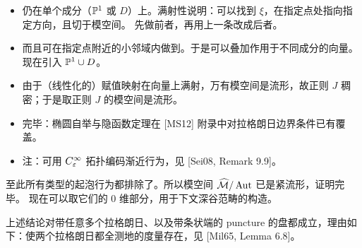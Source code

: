
\begin{itemize}[leftmargin=1.6em,itemsep=0.2em]
\item 仍在单个成分（$\mathbb{P}^1$ 或 $D$）上。满射性说明：可以找到 $\xi$，在指定点处指向指定方向，且切于模空间。
      先做前者，再用上一条改成后者。
\item 而且可在指定点附近的小邻域内做到。于是可以叠加作用于不同成分的向量。现在引入 $\mathbb{P}^1\cup D$。
\item 由于（线性化的）赋值映射在向量上满射，万有模空间是流形，故正则 $J$ 稠密；于是取正则 $J$ 的模空间是流形。
\item 完毕：椭圆自举与隐函数定理在 [MS12] 附录中对拉格朗日边界条件已有覆盖。
\item 注：可用 $C^\infty_\varepsilon$ 拓扑编码渐近行为，见 [Sei08, Remark 9.9]。
\end{itemize}

至此所有类型的起泡行为都排除了。所以模空间 $\widehat{\mathcal{M}}/\operatorname{Aut}$ 已是紧流形，证明完毕。
现在可以取它们的 $0$ 维部分，用于下文深谷范畴的构造。

\begin{corollary}\label{c7:cor-general-disc}
上述结论对带任意多个拉格朗日、以及带条状端的 puncture 的盘都成立，理由如下：使两个拉格朗日都全测地的度量存在，见 [Mil65, Lemma 6.8]。
\end{corollary}

